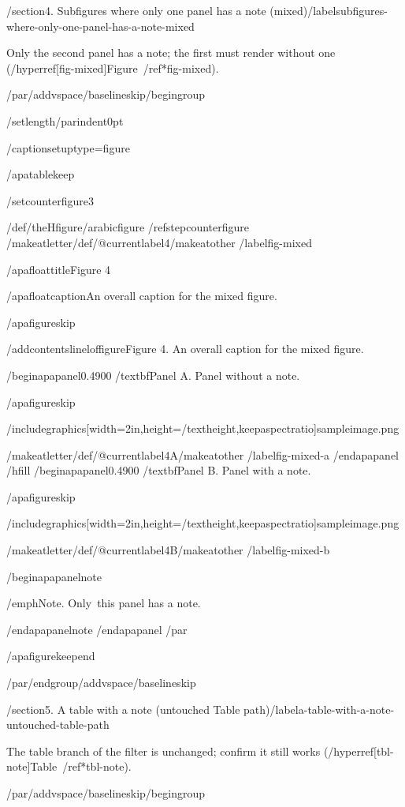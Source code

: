 /section{4. Subfigures where only one panel has a note
(mixed)}/label{subfigures-where-only-one-panel-has-a-note-mixed}

Only the second panel has a note; the first must render without one
(/hyperref[fig-mixed]{Figure~/ref*{fig-mixed}}).

/par/addvspace{/baselineskip}/begingroup

/setlength{/parindent}{0pt}

/captionsetup{type=figure}

/apatablekeep

/setcounter{figure}{3}

/def/theHfigure{/arabic{figure}}%
/refstepcounter{figure}%
/makeatletter/def/@currentlabel{4}/makeatother%
/label{fig-mixed}

/apafloattitle{Figure 4}

/apafloatcaption{An overall caption for the mixed figure.}

/apafigureskip

/addcontentsline{lof}{figure}{Figure 4. An overall caption for the mixed
figure.}

/begin{apapanel}{0.4900}%
/textbf{Panel A}. Panel without a note.

/apafigureskip

/includegraphics[width=2in,height=/textheight,keepaspectratio]{sampleimage.png}

/makeatletter/def/@currentlabel{4A}/makeatother%
/label{fig-mixed-a}
/end{apapanel}%
/hfill
/begin{apapanel}{0.4900}%
/textbf{Panel B}. Panel with a note.

/apafigureskip

/includegraphics[width=2in,height=/textheight,keepaspectratio]{sampleimage.png}

/makeatletter/def/@currentlabel{4B}/makeatother%
/label{fig-mixed-b}

/begin{apapanelnote}

/emph{Note}. Only~this panel has a note.

/end{apapanelnote}
/end{apapanel}%
/par

/apafigurekeepend

/par/endgroup/addvspace{/baselineskip}

/section{5. A table with a note (untouched Table
path)}/label{a-table-with-a-note-untouched-table-path}

The table branch of the filter is unchanged; confirm it still works
(/hyperref[tbl-note]{Table~/ref*{tbl-note}}).

/par/addvspace{/baselineskip}/begingroup

